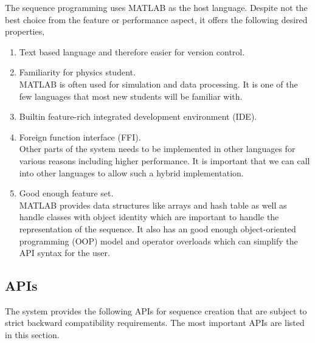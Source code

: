 The sequence programming uses MATLAB as the host language.
Despite not the best choice from the feature or performance aspect,
it offers the following desired properties,
\begin{enumerate}
\item Text based language and therefore easier for version control.
\item Familiarity for physics student.\\
  MATLAB is often used for simulation and data processing.
  It is one of the few languages that most new students will be familiar with.
\item Builtin feature-rich integrated development environment (IDE).
\item Foreign function interface (FFI).\\
  Other parts of the system needs to be implemented in other languages
  for various reasons including higher performance.
  It is important that we can call into other languages to allow such a hybrid implementation.
\item Good enough feature set.\\
  MATLAB provides data structures like arrays and hash table
  as well as handle classes with object identity
  which are important to handle the representation of the sequence.
  It also has an good enough object-oriented programming (OOP) model
  and operator overloads which can simplify the API syntax for the user.
\end{enumerate}

\subsection{APIs}
The system provides the following APIs for sequence creation
that are subject to strict backward compatibility requirements.
The most important APIs are listed in this section.

